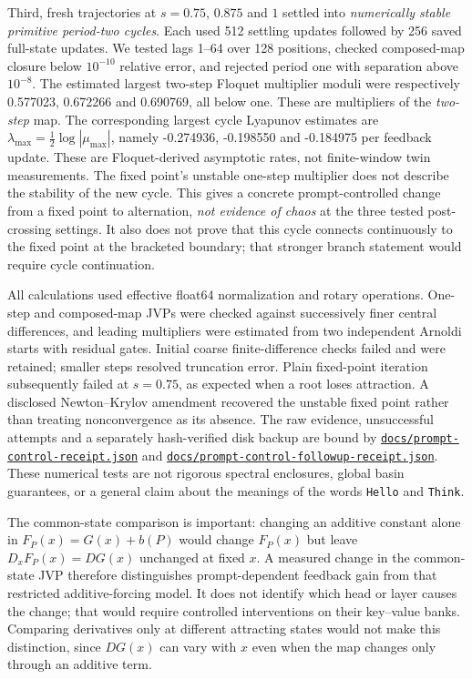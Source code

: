 \documentclass[11pt,letterpaper]{article}
\newcommand{\repourl}{https://github.com/tdj28/neural-shrimp}
\begin{document}
Third, fresh trajectories at $s=0.75$, $0.875$ and $1$ settled into
\emph{numerically stable primitive period-two cycles}. Each used 512 settling
updates followed by 256 saved full-state updates. We tested lags 1--64 over
128 positions, checked composed-map closure below $10^{-10}$ relative error,
and rejected period one with separation above $10^{-8}$. The estimated
largest two-step Floquet multiplier moduli were respectively
0.577023, 0.672266 and 0.690769, all below one. These are multipliers
of the \emph{two-step} map. The corresponding largest cycle Lyapunov estimates are
$\lambda_{\max}=\tfrac12\log|\mu_{\max}|$, namely
-0.274936, -0.198550 and
-0.184975 per feedback update. These are Floquet-derived
asymptotic rates, not finite-window twin measurements. The fixed point's
unstable one-step multiplier does not describe the stability of the new cycle. This gives a concrete
prompt-controlled change from a fixed point to alternation, \emph{not evidence
of chaos} at the three tested post-crossing settings. It also does not prove
that this cycle connects continuously to the fixed point at the bracketed
boundary; that stronger branch statement would require cycle continuation.

All calculations used effective float64 normalization and rotary operations.
One-step and composed-map JVPs were checked against successively finer central
differences, and leading multipliers were estimated from two independent
Arnoldi starts with residual gates. Initial coarse finite-difference checks
failed and were retained; smaller steps resolved truncation error. Plain
fixed-point iteration subsequently failed at $s=0.75$, as expected when a
root loses attraction. A disclosed Newton--Krylov amendment recovered the
unstable fixed point rather than treating nonconvergence as its absence.
The raw evidence, unsuccessful attempts and a separately hash-verified disk
backup are bound by \href{\repourl/blob/c2ba0404b03c0fb6b031b3756443d3d0a2fa8a14/docs/prompt-control-receipt.json}{\nolinkurl{docs/prompt-control-receipt.json}} and
\href{\repourl/blob/c2ba0404b03c0fb6b031b3756443d3d0a2fa8a14/docs/prompt-control-followup-receipt.json}{\nolinkurl{docs/prompt-control-followup-receipt.json}}. These numerical tests are
not rigorous spectral enclosures, global basin guarantees, or a general
claim about the meanings of the words \texttt{Hello} and \texttt{Think}.

The common-state comparison is important: changing an additive constant alone in
$F_P(x)=G(x)+b(P)$ would change $F_P(x)$ but leave $D_xF_P(x)=DG(x)$ unchanged at
fixed $x$. A measured change in the common-state JVP therefore distinguishes
prompt-dependent feedback gain from that restricted additive-forcing model.
It does not identify which head or layer causes the change; that would require
controlled interventions on their key--value banks. Comparing derivatives only
at different attracting states would not make this distinction, since $DG(x)$
can vary with $x$ even when the map changes only through an additive term.
\end{document}
